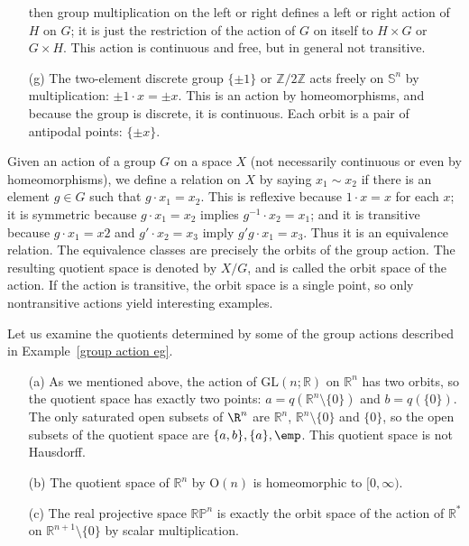 \begin{example}
\begin{itemize}
then group multiplication on the left or right defines a left or right action of $H$ on $G$; it is just the restriction of the action of $G$ on itself to $H\times G$ or $G\times H$. This action is continuous and free, but in general not transitive.
\item[(g)] The two-element discrete group $\{\pm1\}$ or $\mathbb{Z}/2\mathbb{Z}$ acts freely on $\mathbb{S}^n$ by multiplication: $\pm1\cdot x=\pm x$. This is an action by homeomorphisms, and because the group is discrete, it is continuous. Each orbit is a pair of antipodal points: $\{\pm x\}$.
\end{itemize}
\end{example}
Given an action of a group $G$ on a space $X$ (not necessarily continuous or even
by homeomorphisms), we define a relation on $X$ by saying $x_1\sim x_2$ if there is an
element $g\in G$ such that $g\cdot x_1=x_2$. This is reflexive because $1\cdot x=x$ for each $x$; it is symmetric because $g\cdot x_1=x_2$ implies $g^{-1}\cdot x_2=x_1$; and it is transitive because $g\cdot x_1 =x2$ and $g'\cdot x_2=x_3$ imply $g'g\cdot x_1=x_3$. Thus it is an equivalence relation. The equivalence classes are precisely the orbits of the group action. The resulting quotient space is denoted by $X/G$, and is called the orbit space of the action. If the action is transitive, the orbit space is a single point, so only nontransitive actions
yield interesting examples.\par
Let us examine the quotients determined by some of the group actions described in Example~\ref{group action eg}.
\begin{example}
\mbox{}
\begin{itemize}
\item[(a)] As we mentioned above, the action of $\mathrm{GL}(n;\mathbb{R})$ on $\mathbb{R}^n$  has two orbits, so the quotient space has exactly two points: $a=q(\mathbb{R}^n\setminus\{0\})$ and $b=q(\{0\})$. The only saturated open subsets of $\R^n$ are $\mathbb{R}^n$, $\mathbb{R}^n\setminus\{0\}$ and $\{0\}$, so the open subsets of the quotient space are $\{a,b\},\{a\},\emp$. This quotient space is not Hausdorff.
\item[(b)] The quotient space of $\mathbb{R}^n$ by $\mathrm{O}(n)$ is homeomorphic to $[0,\infty)$.
\item[(c)] The real projective space $\mathbb{RP}^n$  is exactly the orbit space of the action of $\mathbb{R}^*$ on $\mathbb{R}^{n+1}\setminus\{0\}$ by scalar multiplication.
\end{itemize}
\end{example}
